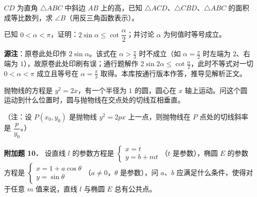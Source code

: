 \begin{question}
$CD$ 为直角 $\triangle ABC$ 中斜边 $AB$ 上的高，已知 $\triangle ACD$、$\triangle CBD$、$\triangle ABC$ 的面积成等比数列，求 $\angle B$（用反三角函数表示）。

\end{question}
\begin{question}
已知 $0<\alpha<\pi$，证明：$2\sin\alpha\leqslant\cot\dfrac{\alpha}{2}$；并讨论 $\alpha$ 为何值时等号成立。

\begin{gktip}
\textbf{源注}：原卷此处印作 $2\sin\alpha$。该式在 $\alpha>\frac{\pi}{3}$ 时不成立（如 $\alpha=\frac{\pi}{2}$ 时左端为 $2$、右端为 $1$），故原卷此处印刷有误；通行题解作 $2\sin 2\alpha\leqslant\cot\frac{\alpha}{2}$，此时不等式对一切 $0<\alpha<\pi$ 成立且等号在 $\alpha=\frac{\pi}{3}$ 取得。本库按通行版本作答，推导见解析正文。
\end{gktip}

\end{question}
\begin{question}
抛物线的方程是 $y^2=2x$，有一个半径为 $1$ 的圆，圆心在 $x$ 轴上运动。问这个圆运动到什么位置时，圆与抛物线在交点处的切线互相垂直。

（注：设 $P(x_0,y_0)$ 是抛物线 $y^2=2px$ 上一点，则抛物线在 $P$ 点处的切线斜率是 $\dfrac{p}{y_0}$。）

\textbf{附加题 10．} 设直线 $l$ 的参数方程是 $\begin{cases}x=t\\ y=b+mt\end{cases}$（$t$ 是参数），椭圆 $E$ 的参数方程是 $\begin{cases}x=1+a\cos\theta\\ y=\sin\theta\end{cases}$（$a\neq0$，$\theta$ 是参数），问 $a$、$b$ 应满足什么条件，使得对于任意 $m$ 值来说，直线 $l$ 与椭圆 $E$ 总有公共点。

\end{question}